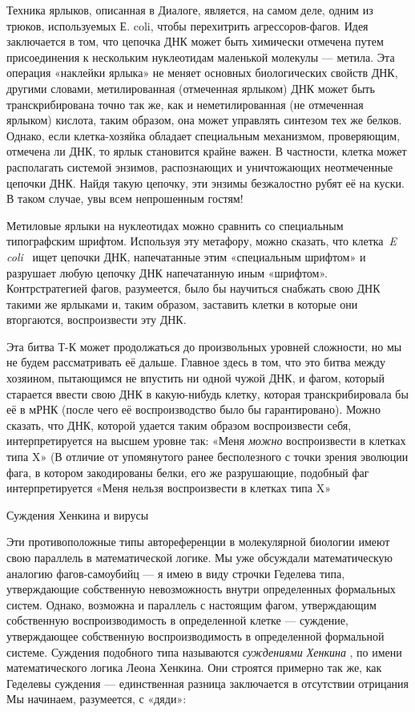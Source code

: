 \documentclass[../main.tex]{subfiles}
\begin{document}
Техника ярлыков, описанная в Диалоге, является, на самом деле, одним из трюков, используемых Е. coli, чтобы перехитрить агрессоров-фагов. Идея заключается в том, что цепочка ДНК может быть химически отмечена путем присоединения к нескольким нуклеотидам маленькой молекулы --- метила. Эта операция «наклейки ярлыка» не меняет основных биологических свойств ДНК, другими словами, метилированная (отмеченная ярлыком) ДНК может быть транскрибирована точно так же, как и неметилированная (не отмеченная ярлыком) кислота, таким образом, она может управлять синтезом тех же белков. Однако, если клетка-хозяйка обладает специальным механизмом, проверяющим, отмечена ли ДНК, то ярлык становится крайне важен. В частности, клетка может располагать системой энзимов, распознающих и уничтожающих неотмеченные цепочки ДНК. Найдя такую цепочку, эти энзимы безжалостно рубят её на куски. В таком случае, увы всем непрошенным гостям!

Метиловые ярлыки на нуклеотидах можно сравнить со специальным типографским шрифтом. Используя эту метафору, можно сказать, что клетка~\emph{E coli} ~ищет цепочки ДНК, напечатанные этим «специальным шрифтом» и разрушает любую цепочку ДНК напечатанную иным «шрифтом». Контрстратегией фагов, разумеется, было бы научиться снабжать свою ДНК такими же ярлыками и, таким образом, заставить клетки в которые они вторгаются, воспроизвести эту ДНК.

Эта битва Т-К может продолжаться до произвольных уровней сложности, но мы не будем рассматривать её дальше. Главное здесь в том, что это битва между хозяином, пытающимся не впустить ни одной чужой ДНК, и фагом, который старается ввести свою ДНК в какую-нибудь клетку, которая транскрибировала бы её в мРНК (после чего её воспроизводство было бы гарантировано). Можно сказать, что ДНК, которой удается таким образом воспроизвести себя, интерпретируется на высшем уровне так: «Меня \emph{можно} воспроизвести в клетках типа X» (В отличие от упомянутого ранее бесполезного с точки зрения эволюции фага, в котором закодированы белки, его же разрушающие, подобный фаг интерпретируется «Меня нельзя воспроизвести в клетках типа X»

Суждения Хенкина и вирусы

Эти противоположные типы автореференции в молекулярной биологии имеют свою параллель в математической логике. Мы уже обсуждали математическую аналогию фагов-самоубийц --- я имею в виду строчки Геделева типа, утверждающие собственную невозможность внутри определенных формальных систем. Однако, возможна и параллель с настоящим фагом, утверждающим собственную воспроизводимость в определенной клетке --- суждение, утверждающее собственную воспроизводимость в определенной формальной системе. Суждения подобного типа называются \emph{суждениями Хенкина} , по имени математического логика Леона Хенкина. Они строятся примерно так же, как Геделевы суждения --- единственная разница заключается в отсутствии отрицания Мы начинаем, разумеется, с «дяди»:
\end{document}
